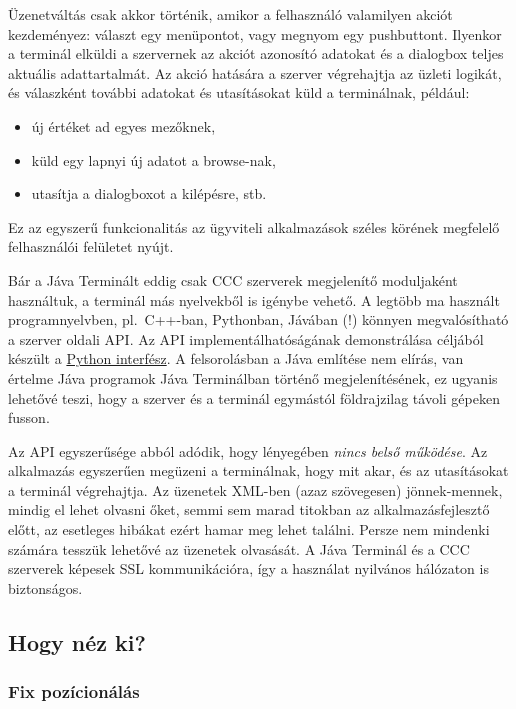 Üzenetváltás csak akkor történik, amikor a felhasználó valamilyen
akciót kezdeményez: választ egy menüpontot, vagy megnyom egy pushbuttont.
Ilyenkor a terminál elküldi a szervernek az akciót azonosító adatokat 
és a dialogbox teljes aktuális adattartalmát. 
Az akció hatására a szerver végrehajtja az üzleti logikát, 
és válaszként további adatokat és utasításokat küld a terminálnak,
például:
\begin{itemize}
  \item 
    új értéket ad egyes mezőknek,
  \item
    küld egy lapnyi új adatot a browse-nak,
  \item
    utasítja a dialogboxot a kilépésre, stb.
\end{itemize}
Ez az egyszerű funkcionalitás az ügyviteli alkalmazások széles 
körének megfelelő felhasználói felületet nyújt. 

Bár a Jáva Terminált eddig csak CCC szerverek megjelenítő
moduljaként használtuk, a terminál  más nyelvekből is igénybe vehető. 
A legtöbb ma használt programnyelvben, pl.\ C++-ban, Pythonban, Jávában (!) 
könnyen megvalósítható a szerver oldali API. Az API implementálhatóságának 
demonstrálása céljából készült a 
\href{http://ok.comfirm.hu/ccc2/download/jtpython.zip}{Python interfész}.
A felsorolásban a Jáva említése nem elírás, van értelme Jáva programok 
Jáva Terminálban történő megjelenítésének, ez  ugyanis lehetővé teszi, 
hogy a szerver és a terminál egymástól  földrajzilag távoli gépeken fusson. 


Az  API  egyszerűsége abból adódik,
hogy lényegében {\em nincs belső működése}. Az alkalmazás egyszerűen
megüzeni a terminálnak, hogy mit akar, és az utasításokat a terminál
végrehajtja. Az üzenetek XML-ben (azaz szövegesen)
jönnek-mennek, mindig el lehet olvasni őket,  semmi sem marad
titokban az alkalmazásfejlesztő előtt, az esetleges hibákat ezért
hamar meg lehet találni.
Persze  nem mindenki számára tesszük lehetővé az üzenetek olvasását. 
A Jáva Terminál és a CCC szerverek képesek SSL kommunikációra, 
így a használat nyilvános hálózaton is biztonságos.

 
\subsection{Hogy néz ki?}

\subsubsection{Fix pozícionálás}
 
